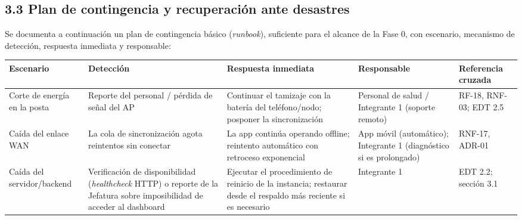\documentclass[11pt,a4paper]{article}
\begin{document}
\subsection{3.3 Plan de contingencia y recuperación ante desastres}\label{plan-de-contingencia-y-recuperaciuxf3n-ante-desastres}

Se documenta a continuación un plan de contingencia básico (\emph{runbook}), suficiente para el alcance de la Fase 0, con escenario, mecanismo de detección, respuesta inmediata y responsable:

{\small
\begin{longtable}[]{@{}
  >{\raggedright\arraybackslash}p{}
  >{\raggedright\arraybackslash}p{}
  >{\raggedright\arraybackslash}p{}
  >{\raggedright\arraybackslash}p{}
  >{\raggedright\arraybackslash}p{}@{}}
\toprule\noalign{}
\begin{minipage}[b]{\linewidth}\raggedright
Escenario
\end{minipage} & \begin{minipage}[b]{\linewidth}\raggedright
Detección
\end{minipage} & \begin{minipage}[b]{\linewidth}\raggedright
Respuesta inmediata
\end{minipage} & \begin{minipage}[b]{\linewidth}\raggedright
Responsable
\end{minipage} & \begin{minipage}[b]{\linewidth}\raggedright
Referencia cruzada
\end{minipage} \\
\midrule\noalign{}
\endhead
\bottomrule\noalign{}
\endlastfoot
Corte de energía en la posta & Reporte del personal / pérdida de señal del AP & Continuar el tamizaje con la batería del teléfono/nodo; posponer la sincronización & Personal de salud / Integrante 1 (soporte remoto) & RF-18, RNF-03; EDT 2.5 \\
Caída del enlace WAN & La cola de sincronización agota reintentos sin conectar & La app continúa operando offline; reintento automático con retroceso exponencial & App móvil (automático); Integrante 1 (diagnóstico si es prolongado) & RNF-17, ADR-01 \\
Caída del servidor/backend & Verificación de disponibilidad (\emph{healthcheck} HTTP) o reporte de la Jefatura sobre imposibilidad de acceder al dashboard & Ejecutar el procedimiento de reinicio de la instancia; restaurar desde el respaldo más reciente si es necesario & Integrante 1 & EDT 2.2; sección 3.1 \\

\end{longtable}}
\end{document}
